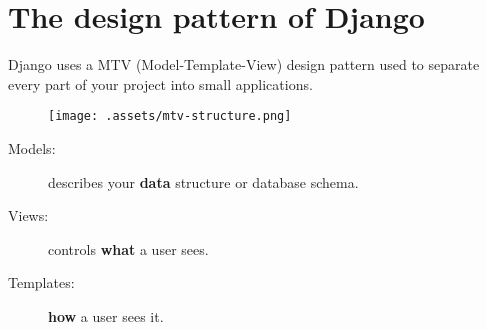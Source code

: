 \section{The design pattern of Django}
    Django uses a MTV (Model-Template-View) design pattern used 
    to separate every part of your project into small applications.
    
    \begin{figure}[H]
        \centering
        \texttt{[image: .assets/mtv-structure.png]}
    \end{figure}
    
    \begin{description}
        \item[Models:]
            describes your \textbf{data} structure or database schema.
        \item[Views:]
            controls \textbf{what} a user sees.
        \item[Templates:]
            \textbf{how} a user sees it.
    \end{description}
